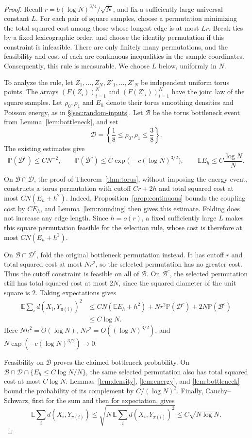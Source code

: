 \documentclass[11pt]{article}
\newcommand{\Pbb}{\mathbb P}
\newcommand{\Ebb}{\mathbb E}
\theoremstyle{remark}
\numberwithin{equation}{section}
\begin{document}
\begin{proof}
Recall \(r=b(\log N)^{3/4}/\sqrt N\), and fix a sufficiently large
universal constant \(L\). For each pair of square samples, choose a
permutation minimizing the total squared cost among those whose longest
edge is at most \(Lr\). Break ties by a fixed lexicographic order, and
choose the identity permutation if this constraint is infeasible.
There are only finitely many permutations, and the feasibility and cost
of each are continuous inequalities in the sample coordinates.
Consequently, this rule is measurable. We choose \(L\) below, uniformly
in \(N\).

To analyze the rule, let
\(Z_1,\ldots,Z_N,Z'_1,\ldots,Z'_N\) be independent uniform torus
points. The arrays \((F(Z_i))_{i=1}^N\) and
\((F(Z'_i))_{i=1}^N\) have the joint law of the square samples.
Let \(\rho_0,\rho_1\) and \(E_h\) denote their torus smoothing
densities and Poisson energy, as in \S\ref{sec:random-inputs}. Let
\(\mathcal B\) be the torus bottleneck event from
Lemma~\ref{lem:bottleneck}, and set
\[
 \mathcal D=\left\{\frac18\le\rho_0,\rho_1\le\frac38\right\}.
\]
The existing estimates give
\[
 \Pbb(\mathcal D^c)\le CN^{-2},\qquad
 \Pbb(\mathcal B^c)
 \le C\exp\bigl(-c(\log N)^{3/2}\bigr),\qquad
 \Ebb E_h\le C\frac{\log N}{N}.
\]

On \(\mathcal B\cap\mathcal D\), the proof of
Theorem~\ref{thm:torus}, without imposing the energy event, constructs
a torus permutation with cutoff \(Cr+2h\) and total squared cost
at most \(CN(E_h+h^2)\). Indeed,
Proposition~\ref{prop:continuous} bounds the coupling cost by \(CE_h\),
and Lemma~\ref{lem:rounding} then gives this estimate. Folding does
not increase any edge length. Since \(h=o(r)\), a fixed sufficiently
large \(L\) makes this square permutation feasible for the selection
rule, whose cost is therefore at most \(CN(E_h+h^2)\).

On \(\mathcal B\cap\mathcal D^c\), fold the original bottleneck
permutation instead. It has cutoff \(r\) and total squared cost at
most \(Nr^2\), so the selected permutation has no greater cost.
Thus the cutoff constraint is feasible on all of \(\mathcal B\).
On \(\mathcal B^c\), the selected permutation still has total squared
cost at most \(2N\), since the squared diameter of the unit square
is \(2\). Taking expectations gives
\begin{align*}
 \Ebb\sum_i d(X_i,Y_{\pi(i)})^2
 &\le CN(\Ebb E_h+h^2)
      +Nr^2\Pbb(\mathcal D^c)+2N\Pbb(\mathcal B^c)\\
 &\le C\log N.
\end{align*}
Here \(Nh^2=O(\log N)\), \(Nr^2=O((\log N)^{3/2})\), and
\(N\exp(-c(\log N)^{3/2})\to0\).

Feasibility on \(\mathcal B\) proves the claimed bottleneck
probability. On
\(\mathcal B\cap\mathcal D\cap\{E_h\le C\log N/N\}\), the
same selected permutation also has total squared cost at most
\(C\log N\). Lemmas~\ref{lem:density}, \ref{lem:energy}, and
\ref{lem:bottleneck} bound the probability of its complement by
\(C/(\log N)^2\). Finally, Cauchy--Schwarz, first for the sum and
then for expectation, gives
\[
 \Ebb\sum_i d(X_i,Y_{\pi(i)})
 \le\sqrt{N\,\Ebb\sum_i d(X_i,Y_{\pi(i)})^2}
 \le C\sqrt{N\log N}.
\]
\end{proof}
\end{document}
